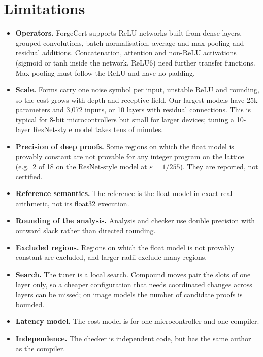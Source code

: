 \documentclass[conference]{IEEEtran}
\begin{document}
\section{Limitations}\label{sec:limits}
\begin{itemize}
\item \textbf{Operators.} ForgeCert supports ReLU networks built from dense layers, grouped convolutions, batch normalisation, average and max-pooling and residual additions. Concatenation, attention and non-ReLU activations (sigmoid or tanh inside the network, ReLU6) need further transfer functions. Max-pooling must follow the ReLU and have no padding.
\item \textbf{Scale.} Forms carry one noise symbol per input, unstable ReLU and rounding, so the cost grows with depth and receptive field. Our largest models have 25k parameters and 3{,}072 inputs, or 10 layers with residual connections. This is typical for 8-bit microcontrollers but small for larger devices; tuning a 10-layer ResNet-style model takes tens of minutes.
\item \textbf{Precision of deep proofs.} Some regions on which the float model is provably constant are not provable for any integer program on the lattice (e.g.\ 2 of 18 on the ResNet-style model at $\varepsilon=1/255$). They are reported, not certified.
\item \textbf{Reference semantics.} The reference is the float model in exact real arithmetic, not its float32 execution.
\item \textbf{Rounding of the analysis.} Analysis and checker use double precision with outward slack rather than directed rounding.
\item \textbf{Excluded regions.} Regions on which the float model is not provably constant are excluded, and larger radii exclude many regions.
\item \textbf{Search.} The tuner is a local search. Compound moves pair the slots of one layer only, so a cheaper configuration that needs coordinated changes across layers can be missed; on image models the number of candidate proofs is bounded.
\item \textbf{Latency model.} The cost model is for one microcontroller and one compiler.
\item \textbf{Independence.} The checker is independent code, but has the same author as the compiler.
\end{itemize}
\end{document}
